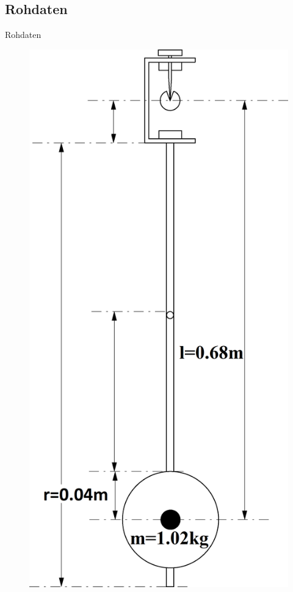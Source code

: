 \documentclass[11pt]{beamer}
\begin{document}
\subsection{Rohdaten}
\begin{frame}{Rohdaten}
\begin{multicols}{2}
\begin{figure}[H]
\centering
\includegraphics[scale=0.08]{Bilder/skizze_pendel_bearbeitet.png}

\end{figure}
\end{multicols}
\end{frame}
\end{document}
